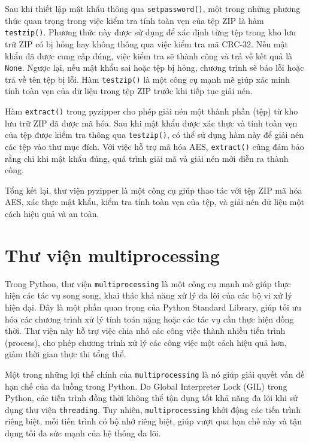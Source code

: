 \documentclass[../DoAn.tex]{subfiles}
\begin{document}
Sau khi thiết lập mật khẩu thông qua \verb|setpassword()|, một trong những phương thức quan trọng trong việc kiểm tra tính toàn vẹn của tệp ZIP là hàm \verb|testzip()|. Phương thức này được sử dụng để xác định từng tệp trong kho lưu trữ ZIP có bị hỏng hay không thông qua việc kiểm tra mã CRC-32. Nếu mật khẩu đã được cung cấp đúng, việc kiểm tra sẽ thành công và trả về kết quả là \verb|None|. Ngược lại, nếu mật khẩu sai hoặc tệp bị hỏng, chương trình sẽ báo lỗi hoặc trả về tên tệp bị lỗi. Hàm \verb|testzip()| là một công cụ mạnh mẽ giúp xác minh tính toàn vẹn của dữ liệu trong tệp ZIP trước khi tiếp tục giải nén.


Hàm \verb|extract()| trong pyzipper cho phép giải nén một thành phần (tệp) từ kho lưu trữ ZIP đã được mã hóa. Sau khi mật khẩu được xác thực và tính toàn vẹn của tệp được kiểm tra thông qua \verb|testzip()|, có thể sử dụng hàm này để giải nén các tệp vào thư mục đích.  Với việc hỗ trợ mã hóa AES, \verb|extract()| cũng đảm bảo rằng chỉ khi mật khẩu đúng, quá trình giải mã và giải nén mới diễn ra thành công.

Tổng kết lại, thư viện pyzipper là một công cụ giúp thao tác với tệp ZIP mã hóa AES, xác thực mật khẩu, kiểm tra tính toàn vẹn của tệp, và giải nén dữ liệu một cách hiệu quả và an toàn.


\section{Thư viện multiprocessing}
\label{section:3.2}

Trong Python, thư viện \verb|multiprocessing| là một công cụ mạnh mẽ giúp thực hiện các tác vụ song song, khai thác khả năng xử lý đa lõi của các bộ vi xử lý hiện đại. Đây là một phần quan trọng của Python Standard Library, giúp tối ưu hóa các chương trình xử lý tính toán nặng hoặc các tác vụ cần thực hiện đồng thời. Thư viện này hỗ trợ việc chia nhỏ các công việc thành nhiều tiến trình (process), cho phép chương trình xử lý các công việc một cách hiệu quả hơn, giảm thời gian thực thi tổng thể.

Một trong những lợi thế chính của \verb|multiprocessing| là nó giúp giải quyết vấn đề hạn chế của đa luồng trong Python. Do Global Interpreter Lock (GIL) trong Python, các tiến trình đồng thời không thể tận dụng tốt khả năng đa lõi khi sử dụng thư viện \verb|threading|. Tuy nhiên, \verb|multiprocessing| khởi động các tiến trình riêng biệt, mỗi tiến trình có bộ nhớ riêng biệt, giúp vượt qua hạn chế này và tận dụng tối đa sức mạnh của hệ thống đa lõi.
\end{document}
